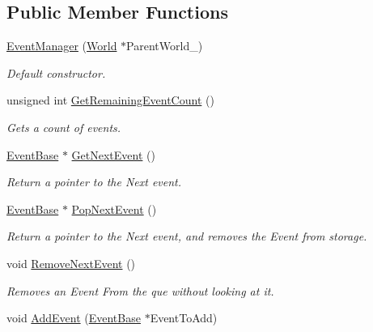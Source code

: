 \subsection*{Public Member Functions}
\begin{DoxyCompactItemize}
\item 
\hyperlink{classphys_1_1EventManager_a148f8c559642d3d50206169b3d0406be}{EventManager} (\hyperlink{classphys_1_1World}{World} $\ast$ParentWorld\_\-)
\begin{DoxyCompactList}\small\item\em Default constructor. \item\end{DoxyCompactList}\item 
unsigned int \hyperlink{classphys_1_1EventManager_a67b755e3fe888e1305312d0f966f4a06}{GetRemainingEventCount} ()
\begin{DoxyCompactList}\small\item\em Gets a count of events. \item\end{DoxyCompactList}\item 
\hyperlink{classphys_1_1EventBase}{EventBase} $\ast$ \hyperlink{classphys_1_1EventManager_aa0937763961aefc59aea197a8f9bc0dc}{GetNextEvent} ()
\begin{DoxyCompactList}\small\item\em Return a pointer to the Next event. \item\end{DoxyCompactList}\item 
\hyperlink{classphys_1_1EventBase}{EventBase} $\ast$ \hyperlink{classphys_1_1EventManager_ae403b203bc425744377ec5fc311f4e5d}{PopNextEvent} ()
\begin{DoxyCompactList}\small\item\em Return a pointer to the Next event, and removes the Event from storage. \item\end{DoxyCompactList}\item 
void \hyperlink{classphys_1_1EventManager_a2389a44d199f121e1fea741f83248513}{RemoveNextEvent} ()
\begin{DoxyCompactList}\small\item\em Removes an Event From the que without looking at it. \item\end{DoxyCompactList}\item 
void \hyperlink{classphys_1_1EventManager_abada23d83ef38e59a38eb91a88a07404}{AddEvent} (\hyperlink{classphys_1_1EventBase}{EventBase} $\ast$EventToAdd)

\end{DoxyCompactItemize}

